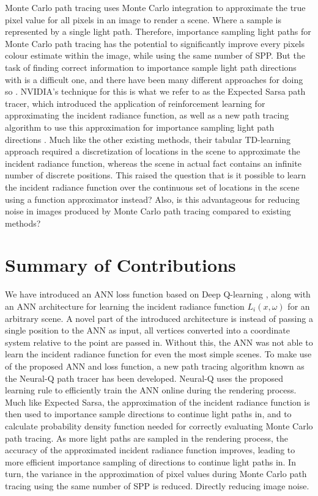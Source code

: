 \documentclass[../dissertation.tex]{subfiles}
\begin{document}
Monte Carlo path tracing uses Monte Carlo integration to approximate the true pixel value for all pixels in an image to render a scene. Where a sample is represented by a single light path. Therefore, importance sampling light paths for Monte Carlo path tracing has the potential to significantly improve every pixels colour estimate within the image, while using the same number of SPP. But the task of finding correct information to importance sample light path directions with is a difficult one, and there have been many different approaches for doing so \cite{vorba2014line, muller2017practical, dahm2017learning}. NVIDIA's technique for this is what we refer to as the Expected Sarsa path tracer, which introduced the application of reinforcement learning for approximating the incident radiance function, as well as a new path tracing algorithm to use this approximation for importance sampling light path directions \cite{dahm2017learning}. Much like the other existing methods, their tabular TD-learning approach required a discretization of locations in the scene to approximate the incident radiance function, whereas the scene in actual fact contains an infinite number of discrete positions. This raised the question that is it possible to learn the incident radiance function over the continuous set of locations in the scene using a function approximator instead? Also, is this advantageous for reducing noise in images produced by Monte Carlo path tracing compared to existing methods?

\section{Summary of Contributions}

We have introduced an ANN loss function based on Deep Q-learning \cite{mnih2013playing}, along with an ANN architecture for learning the incident radiance function $L_i(x, \omega)$ \cite{kajiya1986rendering} for an arbitrary scene. A novel part of the introduced architecture is instead of passing a single position to the ANN as input, all vertices converted into a coordinate system relative to the point are passed in. Without this, the ANN was not able to learn the incident radiance function for even the most simple scenes. To make use of the proposed ANN and loss function, a new path tracing algorithm known as the Neural-Q path tracer has been developed. Neural-Q uses the proposed learning rule to efficiently train the ANN online during the rendering process. Much like Expected Sarsa, the approximation of the incident radiance function is then used to importance sample directions to continue light paths in, and to calculate probability density function needed for correctly evaluating Monte Carlo path tracing. As more light paths are sampled in the rendering process, the accuracy of the approximated incident radiance function improves, leading to more efficient importance sampling of directions to continue light paths in. In turn, the variance in the approximation of pixel values during Monte Carlo path tracing using the same number of SPP is reduced. Directly reducing image noise. 
\end{document}
